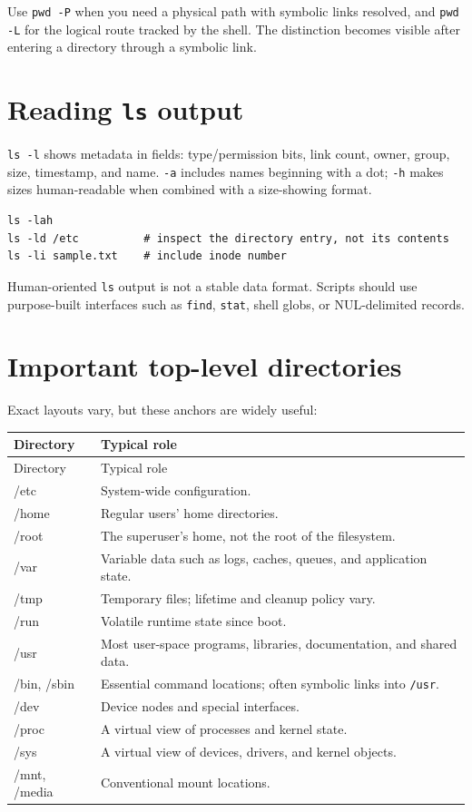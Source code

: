\documentclass[11pt,oneside,openany]{book}
\begin{document}
Use \texttt{pwd -P} when you need a physical path with symbolic links resolved, and \texttt{pwd -L} for the logical route tracked by the shell. The distinction becomes visible after entering a directory through a symbolic link.

\section{Reading \texttt{ls} output}
\texttt{ls -l} shows metadata in fields: type/permission bits, link count, owner, group, size, timestamp, and name. \texttt{-a} includes names beginning with a dot; \texttt{-h} makes sizes human-readable when combined with a size-showing format.
\begin{lstlisting}
ls -lah
ls -ld /etc          # inspect the directory entry, not its contents
ls -li sample.txt    # include inode number
\end{lstlisting}
Human-oriented \texttt{ls} output is not a stable data format. Scripts should use purpose-built interfaces such as \texttt{find}, \texttt{stat}, shell globs, or NUL-delimited records.

\section{Important top-level directories}
Exact layouts vary, but these anchors are widely useful:
\begin{longtable}{>{\ttfamily}p{}p{}}
\toprule
Directory & Typical role \\
\midrule
\endfirsthead\toprule Directory & Typical role \\
\midrule\endhead
/etc & System-wide configuration. \\
/home & Regular users' home directories. \\
/root & The superuser's home, not the root of the filesystem. \\
/var & Variable data such as logs, caches, queues, and application state. \\
/tmp & Temporary files; lifetime and cleanup policy vary. \\
/run & Volatile runtime state since boot. \\
/usr & Most user-space programs, libraries, documentation, and shared data. \\
/bin, /sbin & Essential command locations; often symbolic links into \texttt{/usr}. \\
/dev & Device nodes and special interfaces. \\
/proc & A virtual view of processes and kernel state. \\
/sys & A virtual view of devices, drivers, and kernel objects. \\
/mnt, /media & Conventional mount locations. \\
\bottomrule
\end{longtable}
\end{document}
